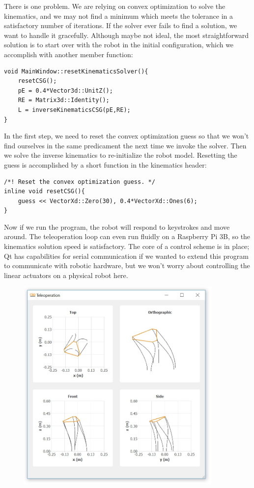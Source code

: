 \documentclass[12pt]{article}
\begin{document}
There is one problem. We are relying on convex optimization to solve the kinematics, and we may not find a minimum which meets the tolerance in a satisfactory number of iterations. If the solver ever fails to find a solution, we want to handle it gracefully. Although maybe not ideal, the most straightforward solution is to start over with the robot in the initial configuration, which we accomplish with another member function:
\begin{lstlisting}
void MainWindow::resetKinematicsSolver(){
    resetCSG();
    pE = 0.4*Vector3d::UnitZ();
    RE = Matrix3d::Identity();
    L = inverseKinematicsCSG(pE,RE);
}
\end{lstlisting}
In the first step, we need to reset the convex optimization guess so that we won't find ourselves in the same predicament the next time we invoke the solver. Then we solve the inverse kinematics to re-initialize the robot model. Resetting the guess is accomplished by a short function in the kinematics header:

\begin{lstlisting}
/*! Reset the convex optimization guess. */
inline void resetCSG(){
    guess << VectorXd::Zero(30), 0.4*VectorXd::Ones(6);
}
\end{lstlisting}

Now if we run the program, the robot will respond to keystrokes and move around. The teleoperation loop can even run fluidly on a Raspberry Pi 3B, so the kinematics solution speed is satisfactory. The core of a control scheme is in place; Qt has capabilities for serial communication if we wanted to extend this program to communicate with robotic hardware, but we won't worry about controlling the linear actuators on a physical robot here.
\begin{figure}[h]
	\centering
		\includegraphics[width=0.9\textwidth]{fig/Moved.jpg}
\end{figure}
\end{document}
